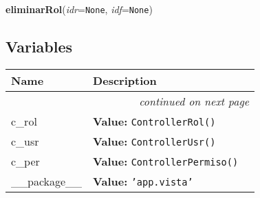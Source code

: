     \label{app:vista:vistaRol:eliminarRol}

    \vspace{0.5ex}

\hspace{.8\funcindent}\begin{boxedminipage}{\funcwidth}

    \raggedright \textbf{eliminarRol}(\textit{idr}={\tt None}, \textit{idf}={\tt None})

\setlength{\parskip}{2ex}
\setlength{\parskip}{1ex}
    \end{boxedminipage}



  \subsection{Variables}

    \vspace{-1cm}
\hspace{\varindent}\begin{longtable}{|p{\varnamewidth}|p{\vardescrwidth}|l}
\cline{1-2}
\cline{1-2} \centering \textbf{Name} & \centering \textbf{Description}& \\
\cline{1-2}
\endhead\cline{1-2}\multicolumn{3}{r}{\small\textit{continued on next page}}\\\endfoot\cline{1-2}
\endlastfoot\raggedright c\-\_\-r\-o\-l\- & \raggedright \textbf{Value:} 
{\tt ControllerRol()}&\\
\cline{1-2}
\raggedright c\-\_\-u\-s\-r\- & \raggedright \textbf{Value:} 
{\tt ControllerUsr()}&\\
\cline{1-2}
\raggedright c\-\_\-p\-e\-r\- & \raggedright \textbf{Value:} 
{\tt ControllerPermiso()}&\\
\cline{1-2}
\raggedright \_\-\_\-p\-a\-c\-k\-a\-g\-e\-\_\-\_\- & \raggedright \textbf{Value:} 
{\tt \texttt{'}\texttt{app.vista}\texttt{'}}&\\
\cline{1-2}
\end{longtable}

